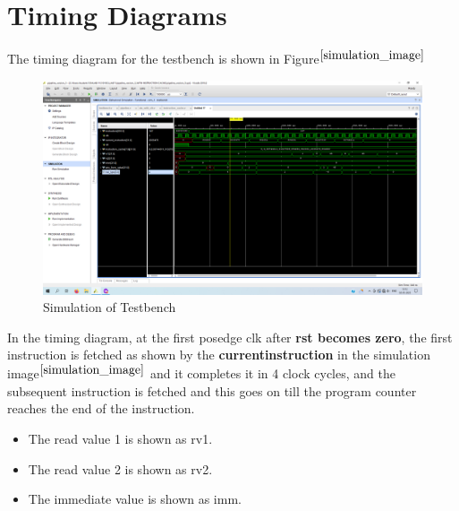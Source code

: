 \section{Timing Diagrams}
The timing diagram for the testbench is shown in Figure$^{\ref{simulation_image}}$

\begin{figure}[H]
  \centering
  \includegraphics[width=\textwidth]{./images/simulation_lab_7.png}
  \caption{Simulation of Testbench}
  \label{simulation_image}
\end{figure}
In the timing diagram, at the first posedge clk after \textbf{rst becomes zero}, the first instruction is fetched as shown by the \textbf{current\textunderscore instruction} in the simulation image$^{\ref{simulation_image}}$ and it completes it in 4 clock cycles, and the subsequent instruction is fetched and this goes on till the program counter reaches the end of the instruction.
\begin{itemize}
  \item The read value 1 is shown as rv1.
  \item The read value 2 is shown as rv2.
  \item The immediate value is shown as imm.
\end{itemize}